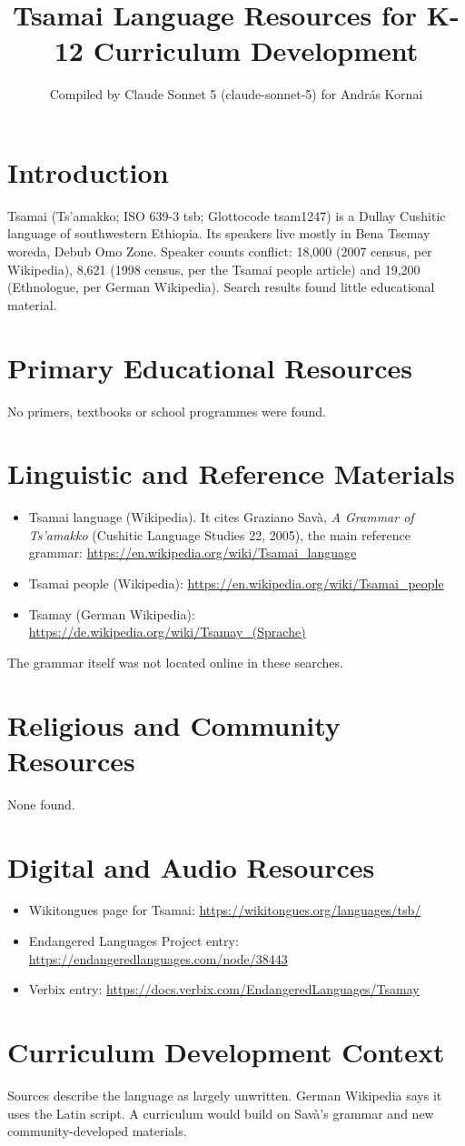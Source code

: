 \documentclass[12pt]{article}
\title{Tsamai Language Resources for K-12 Curriculum Development}
\author{Compiled by Claude Sonnet 5 (claude-sonnet-5) for Andr\'as Kornai}
\date{}
\begin{document}
\maketitle

\section{Introduction}
Tsamai (Ts'amakko; ISO 639-3 tsb; Glottocode tsam1247) is a Dullay Cushitic language of southwestern Ethiopia. Its speakers live mostly in Bena Tsemay woreda, Debub Omo Zone. Speaker counts conflict: 18,000 (2007 census, per Wikipedia), 8,621 (1998 census, per the Tsamai people article) and 19,200 (Ethnologue, per German Wikipedia). Search results found little educational material.

\section{Primary Educational Resources}
No primers, textbooks or school programmes were found.

\section{Linguistic and Reference Materials}
\begin{itemize}
\item Tsamai language (Wikipedia). It cites Graziano Sav\`a, \emph{A Grammar of Ts'amakko} (Cushitic Language Studies 22, 2005), the main reference grammar: \url{https://en.wikipedia.org/wiki/Tsamai_language}
\item Tsamai people (Wikipedia): \url{https://en.wikipedia.org/wiki/Tsamai_people}
\item Tsamay (German Wikipedia): \url{https://de.wikipedia.org/wiki/Tsamay_(Sprache)}
\end{itemize}
The grammar itself was not located online in these searches.

\section{Religious and Community Resources}
None found.

\section{Digital and Audio Resources}
\begin{itemize}
\item Wikitongues page for Tsamai: \url{https://wikitongues.org/languages/tsb/}
\item Endangered Languages Project entry: \url{https://endangeredlanguages.com/node/38443}
\item Verbix entry: \url{https://docs.verbix.com/EndangeredLanguages/Tsamay}
\end{itemize}

\section{Curriculum Development Context}
Sources describe the language as largely unwritten. German Wikipedia says it uses the Latin script. A curriculum would build on Sav\`a's grammar and new community-developed materials.
\end{document}

